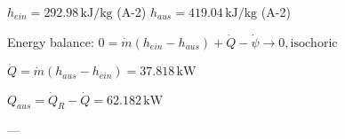 \( h_{ein} = 292.98 \, \text{kJ/kg} \) (A-2)  
\( h_{aus} = 419.04 \, \text{kJ/kg} \) (A-2)  

Energy balance:  
\( 0 = \dot{m} (h_{ein} - h_{aus}) + \dot{Q} - \dot{\psi} \rightarrow 0, \text{isochoric} \)  

\( \dot{Q} = \dot{m} (h_{aus} - h_{ein}) = 37.818 \, \text{kW} \)  

\( Q_{aus} = \dot{Q}_R - \dot{Q} = 62.182 \, \text{kW} \)  

---